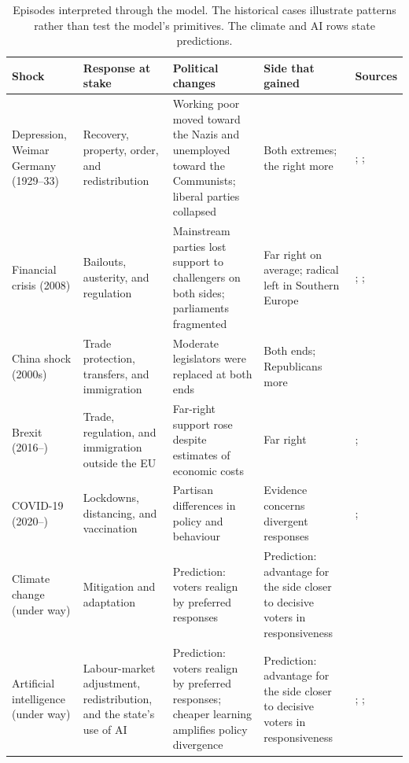 \documentclass[12pt,letterpaper]{article}
\renewcommand{\arraystretch}{0.75}
\begin{document}
\begin{table}[t]
\centering
\small
\renewcommand{\arraystretch}{1.3}
\begin{tabular}{@{}L{2.1cm}L{2.7cm}L{3.8cm}L{2.4cm}L{3.2cm}@{}}
\toprule
Shock & Response at stake & Political changes & Side that gained & Sources \\
\midrule
Depression, Weimar Germany (1929--33) & Recovery, property, order, and redistribution & Working poor moved toward the Nazis and unemployed toward the Communists; liberal parties collapsed & Both extremes; the right more & \citet{King2008}; \citet{Falter1991}; \citet{Hamilton1982} \\
Financial crisis (2008) & Bailouts, austerity, and regulation & Mainstream parties lost support to challengers on both sides; parliaments fragmented & Far right on average; radical left in Southern Europe & \citet{Funke2016}; \citet{Mian2014}; \citet{Hernandez2016} \\
China shock (2000s) & Trade protection, transfers, and immigration & Moderate legislators were replaced at both ends & Both ends; Republicans more & \citet{Autor2020} \\
Brexit (2016--) & Trade, regulation, and immigration outside the EU & Far-right support rose despite estimates of economic costs & Far right & \citet{BornEtAl2019}; \citet{Curtice2025} \\
COVID-19 (2020--) & Lockdowns, distancing, and vaccination & Partisan differences in policy and behaviour & Evidence concerns divergent responses & \citet{Allcott2020}; \citet{Adolph2022} \\
Climate change (under way) & Mitigation and adaptation & Prediction: voters realign by preferred responses & Prediction: advantage for the side closer to decisive voters in responsiveness & \citet{IPCC2023} \\
Artificial intelligence (under way) & Labour-market adjustment, redistribution, and the state's use of AI & Prediction: voters realign by preferred responses; cheaper learning amplifies policy divergence & Prediction: advantage for the side closer to decisive voters in responsiveness & \citet{Eloundou2024}; \citet{Acemoglu2025}; \citet{Engstrom2020} \\
\bottomrule
\end{tabular}
\caption{Episodes interpreted through the model. The historical cases illustrate patterns rather than test the model's primitives. The climate and AI rows state predictions.}
\label{tab:episodes}
\end{table}
\end{document}
